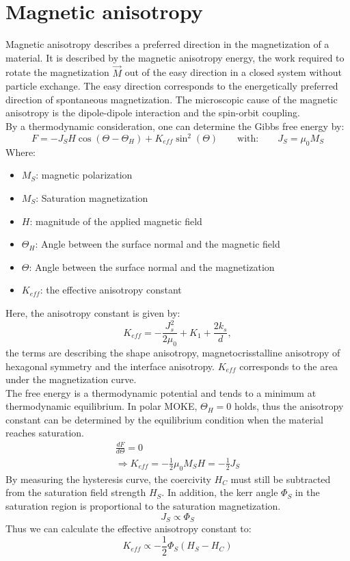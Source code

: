 \section{Magnetic anisotropy}


Magnetic anisotropy describes a preferred direction in the magnetization of a material.  It is described by the magnetic anisotropy energy, the work required to rotate the magnetization $\Vec{M}$ out of the easy direction in a closed system without particle exchange. The easy direction corresponds to the energetically preferred direction of spontaneous magnetization. The microscopic cause of the magnetic anisotropy is the dipole-dipole interaction and the spin-orbit coupling. \\
By a thermodynamic consideration, one can determine the Gibbs free energy by:
\begin{equation}
    F = -J_SH\cos(\Theta-\Theta_H) + K_{eff} \sin^2(\Theta) \qquad \text{with:} \qquad J_S = \mu_0M_S
\end{equation}
Where:
\begin{itemize}
    \item $M_S$: magnetic polarization
    \item $M_S$: Saturation magnetization
    \item $H$: magnitude of the applied magnetic field
    \item $\Theta_H$: Angle between the surface normal and the magnetic field
    \item $\Theta$: Angle between the surface normal and the magnetization
    \item $K_{eff}$: the effective anisotropy constant
\end{itemize}
Here, the anisotropy constant is given by:
\begin{equation}
    K_{eff} = -\frac{J_s^2}{2\mu_0}+K_1+\frac{2k_s}{d},
\end{equation}
the terms are describing the shape anisotropy, magnetocrisstalline anisotropy of hexagonal symmetry and the interface anisotropy. $K_{eff}$ corresponds to the area under the magnetization curve. \\
The free energy is a thermodynamic potential and tends to a minimum at thermodynamic equilibrium. In polar MOKE, $\Theta_H = 0$ holds, thus the anisotropy constant can be determined by the equilibrium condition when the material reaches saturation.
\begin{align}
    \frac{dF}{d\Theta} = 0 \\
    \Rightarrow K_{eff} = -\frac{1}{2}\mu_0M_SH = -\frac{1}{2}J_S
\end{align}
By measuring the hysteresis curve, the coercivity $H_C$ must still be subtracted from the saturation field strength $H_S$. In addition, the kerr angle $\Phi_S$ in the saturation region is proportional to the saturation magnetization. 
\begin{equation}
    J_S \propto \Phi_S
\end{equation}
Thus we can calculate the effective anisotropy constant to:
\begin{equation}
    K_{eff} \propto -\frac{1}{2}\Phi_S(H_S-H_C)
\end{equation}


